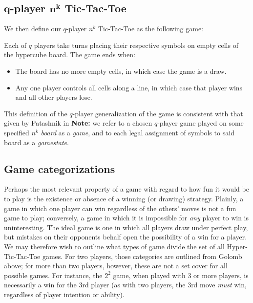 \documentclass[12pt,a4paper]{article}
\begin{document}
\subsection*{$\mathbf{q}$-player $\mathbf{n^k}$ Tic-Tac-Toe}


We then define our $q$-player $n^k$ Tic-Tac-Toe as the following game:

Each of $q$ players take turns placing their respective symbols on empty cells of the hypercube board. The game ends when:
\begin{itemize}\itemsep0pt
\item The board has no more empty cells, in which case the game is a draw.
\item Any one player controls all cells along a line, in which case that player wins and all other players lose. 
\end{itemize}
This definition of the $q$-player generalization of the game is consistent with that given by Patashnik in \cite{patashnik1980qubic}
\textbf{Note:} we refer to a chosen $q$-player game played on some specified $n^k$ \textit{board} as a \textit{game}, and to each legal assignment of symbols to said board as a \textit{gamestate}.


\subsection*{Game categorizations}

Perhaps the most relevant property of a game with regard to how fun it would be to play is the existence or absence of a winning (or drawing) strategy. Plainly, a game in which one player can win regardless of the others' moves is not a fun game to play; conversely, a game in which it is impossible for \textit{any} player to win is uninteresting. The ideal game is one in which all players draw under perfect play, but mistakes on their opponents behalf open the possibility of a win for a player. 
We may therefore wish to outline what types of game divide the set of all Hyper-Tic-Tac-Toe games. For two players, those categories are outlined from Golomb above; for more than two players, however, these are not a set cover for all possible games. For instance, the $2^2$ game, when played with 3 or more players, is necessarily a win for the 3rd player (as with two players, the 3rd move \textit{must} win, regardless of player intention or ability).
\end{document}
